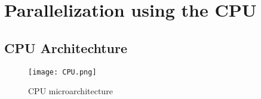 \section{Parallelization using the CPU}


\subsection{CPU Architechture}

\begin{figure}[ht]
    \texttt{[image: CPU.png]}
    \centering
    \caption{\cite*{solvercomp} CPU microarchitecture}
    \label{fig:CPU}
\end{figure}

